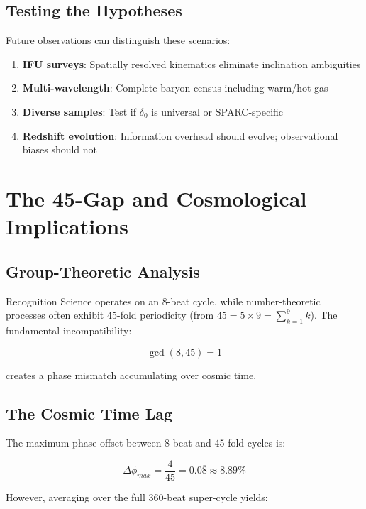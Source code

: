\documentclass[12pt,a4paper]{article}
\begin{document}
\subsection{Testing the Hypotheses}

Future observations can distinguish these scenarios:

\begin{enumerate}
\item \textbf{IFU surveys}: Spatially resolved kinematics eliminate inclination ambiguities
\item \textbf{Multi-wavelength}: Complete baryon census including warm/hot gas
\item \textbf{Diverse samples}: Test if $\delta_0$ is universal or SPARC-specific
\item \textbf{Redshift evolution}: Information overhead should evolve; observational biases should not
\end{enumerate}

\section{The 45-Gap and Cosmological Implications}

\subsection{Group-Theoretic Analysis}

Recognition Science operates on an 8-beat cycle, while number-theoretic processes often exhibit 45-fold periodicity (from $45 = 5 \times 9 = \sum_{k=1}^{9} k$). The fundamental incompatibility:

\begin{equation}
\gcd(8, 45) = 1
\end{equation}

creates a phase mismatch accumulating over cosmic time.

\subsection{The Cosmic Time Lag}

The maximum phase offset between 8-beat and 45-fold cycles is:

\begin{equation}
\Delta \phi_{max} = \frac{4}{45} = 0.0\overline{8} \approx 8.89\%
\end{equation}

However, averaging over the full 360-beat super-cycle yields:
\end{document}
